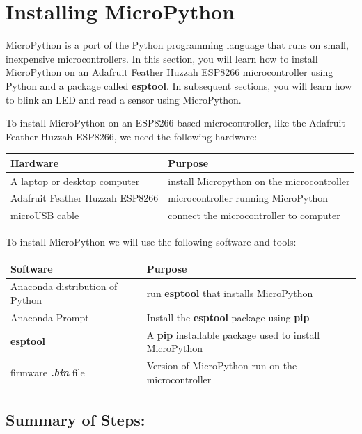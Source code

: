\documentclass{book}
\begin{document}
    
        \section{Installing MicroPython}\label{installing-micropython}
    




    
        MicroPython is a port of the Python programming language that runs on
small, inexpensive microcontrollers. In this section, you will learn how
to install MicroPython on an Adafruit Feather Huzzah ESP8266
microcontroller using Python and a package called \textbf{esptool}. In
subsequent sections, you will learn how to blink an LED and read a
sensor using MicroPython.
    




    
        To install MicroPython on an ESP8266-based microcontroller, like the
Adafruit Feather Huzzah ESP8266, we need the following hardware:

\begin{longtable}[]{@{}ll@{}}
\toprule
Hardware & Purpose\tabularnewline
\midrule
\endhead
A laptop or desktop computer & install Micropython on the
microcontroller\tabularnewline
Adafruit Feather Huzzah ESP8266 & microcontroller running
MicroPython\tabularnewline
microUSB cable & connect the microcontroller to computer\tabularnewline
\bottomrule
\end{longtable}

To install MicroPython we will use the following software and tools:

\begin{longtable}[]{@{}ll@{}}
\toprule
Software & Purpose\tabularnewline
\midrule
\endhead
Anaconda distribution of Python & run \textbf{esptool} that installs
MicroPython\tabularnewline
Anaconda Prompt & Install the \textbf{esptool} package using
\textbf{pip}\tabularnewline
\textbf{esptool} & A \textbf{pip} installable package used to install
MicroPython\tabularnewline
firmware \textbf{\emph{.bin}} file & Version of MicroPython run on the
microcontroller\tabularnewline
\bottomrule
\end{longtable}
    




    
        \subsection{Summary of Steps:}\label{summary-of-steps}
    
\end{document}
